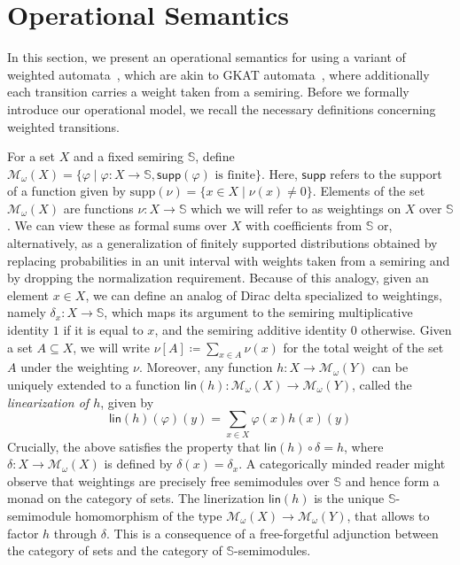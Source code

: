 \documentclass[a4paper,UKenglish,cleveref, autoref, thm-restate]{lipics-v2021}
\newcommand{\Mon}{\mathcal{M}_\omega}
\newcommand{\wgkat}{\textsf{\upshape{wGKAT}}\xspace}
\theoremstyle{plain}\newtheoremrep{thm}{Theorem}[section]
\begin{document}
	\section{Operational Semantics}\label{semanticsS}
	In this section, we present an operational semantics for \wgkat using a variant of weighted automata~\cite{weightedhandbook}, which are akin to GKAT automata~\cite{Smolka_2019}, where additionally each transition carries a weight taken from a semiring. Before we formally introduce our operational model, we recall the necessary definitions concerning weighted transitions. 

		
	\newcommand{\supp}{\mathsf{supp}}

	For a set $X$ and a fixed semiring $\mathbb S$, define $\Mon(X) = \{ \varphi \mid \varphi \colon X \to \mathbb S, \supp(\varphi)\text{ is finite}\}$. Here, $\supp$ refers to the support of a function given by $\text{supp}(\nu) = \{x \in X\;|\;\nu(x) \neq 0\}$. Elements of the set $\Mon(X)$ are functions $\nu:X\to \mathbb S$ which we will refer to as weightings on $X$ over $\mathbb S$. We can view these  as formal sums over $X$ with coefficients from $\mathbb S$ or, alternatively, as a generalization of finitely supported distributions obtained by replacing probabilities in an unit interval with weights taken from a semiring and by dropping the normalization requirement. Because of this analogy, given an element $x \in X$, we can define an analog of Dirac delta specialized to weightings, namely $\delta_x : X \to \mathbb S$, which maps its argument to the semiring multiplicative identity $1$ if it is equal to $x$, and the semiring additive identity $0$ otherwise. Given a set $A \subseteq X$, we will write $\nu[A] \coloneq \sum_{x\in A} \nu(x)$ for the total weight of the set $A$ under the weighting $\nu$. Moreover, any function $h \colon X \to \Mon(Y)$ can be uniquely extended to a function $\mathsf{lin}(h) \colon \Mon(X) \to \Mon(Y)$, called the {\em linearization of $h$}, given by $$\mathsf{lin}(h)(\varphi)(y) = \sum\limits_{x\in X} \varphi(x)h(x)(y)$$
	Crucially, the above satisfies the property that $\mathsf{lin}(h) \circ \delta = h$, where $\delta: X \to \Mon(X)$ is defined by $\delta(x) = \delta_x$. A categorically minded reader might observe that weightings are precisely free semimodules over $\mathbb S$ and hence form a monad on the category of sets. The linerization $\mathsf{lin}(h)$ is the unique $\mathbb S$-semimodule homomorphism of the type $\Mon(X) \to \Mon(Y)$, that allows to factor $h$ through $\delta$. This is a consequence of a free-forgetful adjunction between the category of sets and the category of $\mathbb S$-semimodules.
\end{document}

